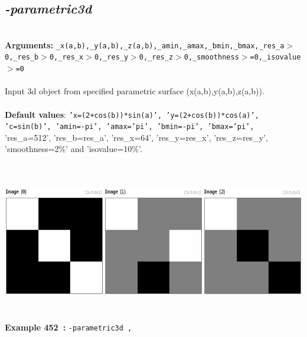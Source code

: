 \documentclass[a4paper,11pt,twoside]{book}
\begin{document}
\subsection{\emph{-parametric3d} }\vspace*{-0.5em}
~\\\textbf{Arguments: } 
{\small \texttt{\_x(a,b),\_y(a,b),\_z(a,b),\_amin,\_amax,\_bmin,\_bmax,\_res\_a$>$0,\_res\_b$>$0,\_res\_x$>$0,\_res\_y$>$0,\_res\_z$>$0,\_smoothness$>$=0,\_isovalue$>$=0}}\\~\\
Input 3d object from specified parametric surface (x(a,b),y(a,b),z(a,b)).
~\\~\\\textbf{Default values}: {\small \texttt{'x=(2+cos(b))*sin(a)', 'y=(2+cos(b))*cos(a)', 'c=sin(b)', 'amin=-pi', 'amax='pi', 'bmin=-pi', 'bmax='pi',}}
~\\'res\_a=512', 'res\_b=res\_a', 'res\_x=64', 'res\_y=res\_x', 'res\_z=res\_y', 'smoothness=2\%' and 'isovalue=10\%'.
\begin{center}\includegraphics[keepaspectratio=true,height=7cm,width=\textwidth]{img/gmic_def452.jpg}\\
{\footnotesize \textbf{Example 452~:} \texttt{-parametric3d ,}}
\end{center}
\end{document}
